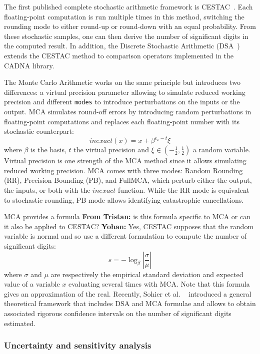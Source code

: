 \documentclass[11pt]{article}
\newcommand{\tristan}[1]{\color{orange}\textbf{From Tristan:} #1\color{black}\xspace}
\newcommand{\Yohan}[1]{\color{green!75!black}\textbf{Yohan:} #1\color{black}\xspace}
\begin{document}
The first published complete stochastic arithmetic framework is CESTAC~\cite{vignes1993stochastic}. Each floating-point computation is run multiple times in this method, switching the rounding mode to either round-up or round-down with
an equal probability. From these stochastic samples, one can then derive the number of significant digits in the computed result. In addition, the Discrete Stochastic Arithmetic (DSA~\cite{vignes2004discrete}) extends the CESTAC method to comparison operators implemented in the CADNA library.

The Monte Carlo Arithmetic works on the same principle but introduces two differences:
a virtual precision parameter allowing to simulate reduced working precision and different \texttt{modes} to introduce perturbations
on the inputs or the output.
MCA simulates round-off errors by introducing random perturbations in floating-point computations and replaces each floating-point number with its stochastic counterpart:
\[
inexact(x) =  x + \beta^{e_x - t}\xi
\]
where $\beta$ is the basis, $t$ the virtual precision and $\xi \in (-\frac{1}{2},\frac{1}{2})$ a random variable.
Virtual precision is one strength of the MCA method since it allows simulating reduced working precision.
MCA comes with three modes: Random Rounding (RR), Precision Bounding (PB), and FullMCA, which perturb either the output, the inputs, or both with the $inexact$ function. While the RR mode is equivalent to stochastic rounding, PB mode allows identifying catastrophic cancellations.

MCA provides a formula \tristan{is this formula specific to MCA or can it also be applied to CESTAC?} \Yohan{Yes, CESTAC supposes that the random variable is normal and so use a different formulation} to compute the number of significant digits:
\begin{equation}
s = -\log_{\beta}{ \left| \dfrac{\sigma}{\mu} \right|} \label{eq:sig-digits}
\end{equation}
where $\sigma$ and $\mu$ are respectively the empirical standard deviation and expected value of a variable $x$ evaluating 
several times with MCA. 
Note that this formula gives an approximation of the real. Recently, Sohier et al. ~\cite{sohier2018confidence} introduced a 
general theoretical framework that includes DSA and MCA formulae and allows to obtain associated rigorous confidence intervals on the number of significant digits estimated.

\subsubsection{Uncertainty and sensitivity analysis}
\end{document}

